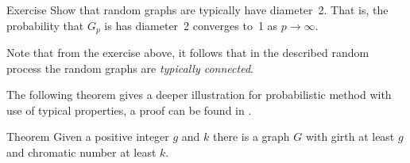 \begin{thm}{Exercise}
Show that random graphs are typically have diameter~2.
That is, the probability that $G_p$ is has diameter~2 converges to~1 as $p\to \infty$.
\end{thm}

Note that from the exercise above, it follows that in the described random process the random graphs are \emph{typically connected}.

The following theorem gives a deeper illustration for probabilistic method with use of typical properties,
a proof can be found in \cite[Chapter 44]{aigner-ziegler}.

\begin{thm}{Theorem}
Given a positive integer $g$ and $k$ there is a graph $G$ with girth at least $g$ and chromatic number at least $k$.
\end{thm}
